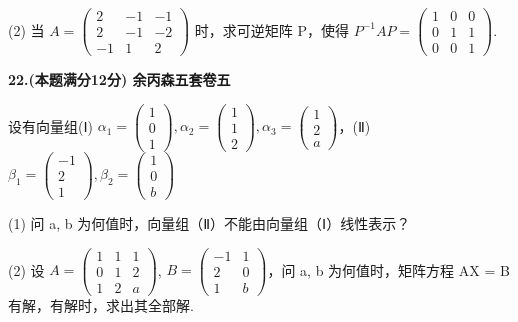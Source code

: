 \documentclass[a4paper,12pt]{article}
\begin{document}
(2) 当 $A = \begin{pmatrix} 2 & -1 & -1 \\ 2 & -1 & -2 \\ -1 & 1 & 2 \end{pmatrix}$ 时，求可逆矩阵 P，使得 $P^{-1} A P = \begin{pmatrix} 1 & 0 & 0 \\ 0 & 1 & 1 \\ 0 & 0 & 1 \end{pmatrix}$.

\vspace{0.5cm}

\textbf{22.(本题满分12分) 余丙森五套卷五}

设有向量组(Ⅰ) $\alpha_{1}=\begin{pmatrix}1\\ 0\\ 1\end{pmatrix},\alpha_{2}=\begin{pmatrix}1\\ 1\\ 2\end{pmatrix},\alpha_{3}=\begin{pmatrix}1\\ 2\\ a\end{pmatrix}$，(Ⅱ) $\beta_{1}=\begin{pmatrix}-1\\ 2\\ 1\end{pmatrix},\beta_{2}=\begin{pmatrix}1\\ 0\\ b\end{pmatrix}$

(1) 问 a, b 为何值时，向量组（Ⅱ）不能由向量组（Ⅰ）线性表示？

(2) 设 $A = \begin{pmatrix} 1 & 1 & 1 \\ 0 & 1 & 2 \\ 1 & 2 & a \end{pmatrix}$, $B = \begin{pmatrix} -1 & 1 \\ 2 & 0 \\ 1 & b \end{pmatrix}$，问 a, b 为何值时，矩阵方程 AX = B 有解，有解时，求出其全部解.

\vspace{0.5cm}
\end{document}
